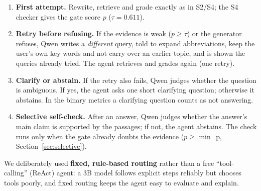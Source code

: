 \documentclass[11pt,a4paper]{report}
\newcommand{\sys}[1]{\textsf{#1}}
\begin{document}
\begin{enumerate}
\item \textbf{First attempt.} Rewrite, retrieve and grade exactly as in \sys{S2}/\sys{S4}; the S4 checker gives the gate score $p$ ($\tau = 0.611$).
\item \textbf{Retry before refusing.} If the evidence is weak ($p \ge \tau$) or the generator refuses, Qwen writes a \emph{different} query, told to expand abbreviations, keep the user's own key words and not carry over an earlier topic, and is shown the queries already tried. The agent retrieves and grades again (one retry).
\item \textbf{Clarify or abstain.} If the retry also fails, Qwen judges whether the question is ambiguous. If yes, the agent asks one short clarifying question; otherwise it abstains. In the binary metrics a clarifying question counts as not answering.
\item \textbf{Selective self-check.} After an answer, Qwen judges whether the answer's main claim is supported by the passages; if not, the agent abstains. The check runs only when the gate already doubts the evidence ($p \ge$ min\_p, Section~\ref{sec:selective}).
\end{enumerate}

We deliberately used \textbf{fixed, rule-based routing} rather than a free ``tool-calling'' (ReAct) agent: a 3B model follows explicit steps reliably but chooses tools poorly, and fixed routing keeps the agent easy to evaluate and explain.
\end{document}
